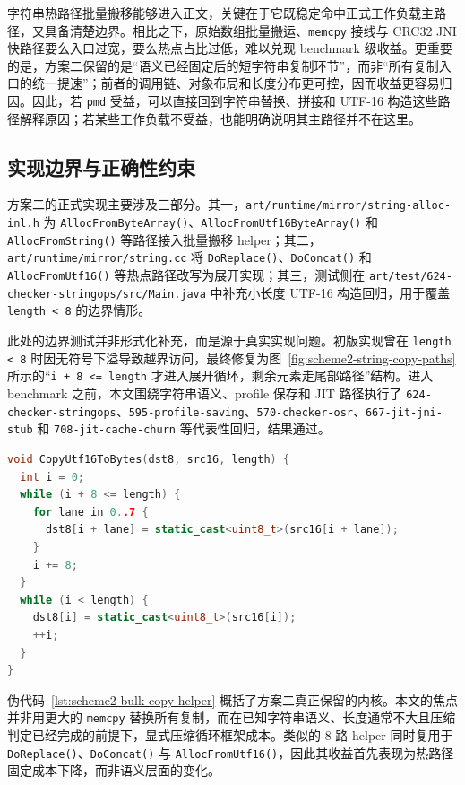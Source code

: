 字符串热路径批量搬移能够进入正文，关键在于它既稳定命中正式工作负载主路径，又具备清楚边界。相比之下，原始数组批量搬运、\texttt{memcpy} 接线与 CRC32 JNI 快路径要么入口过宽，要么热点占比过低，难以兑现 benchmark 级收益。更重要的是，方案二保留的是“语义已经固定后的短字符串复制环节”，而非“所有复制入口的统一提速”；前者的调用链、对象布局和长度分布更可控，因而收益更容易归因。因此，若 \texttt{pmd} 受益，可以直接回到字符串替换、拼接和 UTF-16 构造这些路径解释原因；若某些工作负载不受益，也能明确说明其主路径并不在这里。

\subsection{实现边界与正确性约束}

方案二的正式实现主要涉及三部分。其一，\texttt{art/runtime/mirror/string-alloc-inl.h} 为 \texttt{AllocFromByteArray()}、\texttt{AllocFromUtf16ByteArray()} 和 \texttt{AllocFromString()} 等路径接入批量搬移 helper；其二，\texttt{art/runtime/mirror/string.cc} 将 \texttt{DoReplace()}、\texttt{DoConcat()} 和 \texttt{AllocFromUtf16()} 等热点路径改写为展开实现；其三，测试侧在 \texttt{art/test/624-checker-stringops/src/Main.java} 中补充小长度 UTF-16 构造回归，用于覆盖 \texttt{length < 8} 的边界情形。

此处的边界测试并非形式化补充，而是源于真实实现问题。初版实现曾在 \texttt{length < 8} 时因无符号下溢导致越界访问，最终修复为图~\ref{fig:scheme2-string-copy-paths} 所示的“\texttt{i + 8 <= length} 才进入展开循环，剩余元素走尾部路径”结构。进入 benchmark 之前，本文围绕字符串语义、profile 保存和 JIT 路径执行了 \texttt{624-checker-stringops}、\texttt{595-profile-saving}、\texttt{570-checker-osr}、\texttt{667-jit-jni-stub} 和 \texttt{708-jit-cache-churn} 等代表性回归，结果通过。

\begin{lstlisting}[language=C++,caption={方案二 8 路批量搬移 helper 的核心循环（伪代码）},label={lst:scheme2-bulk-copy-helper}]
void CopyUtf16ToBytes(dst8, src16, length) {
  int i = 0;
  while (i + 8 <= length) {
    for lane in 0..7 {
      dst8[i + lane] = static_cast<uint8_t>(src16[i + lane]);
    }
    i += 8;
  }
  while (i < length) {
    dst8[i] = static_cast<uint8_t>(src16[i]);
    ++i;
  }
}
\end{lstlisting}

伪代码~\ref{lst:scheme2-bulk-copy-helper} 概括了方案二真正保留的内核。本文的焦点并非用更大的 \texttt{memcpy} 替换所有复制，而在已知字符串语义、长度通常不大且压缩判定已经完成的前提下，显式压缩循环框架成本。类似的 8 路 helper 同时复用于 \texttt{DoReplace()}、\texttt{DoConcat()} 与 \texttt{AllocFromUtf16()}，因此其收益首先表现为热路径固定成本下降，而非语义层面的变化。

